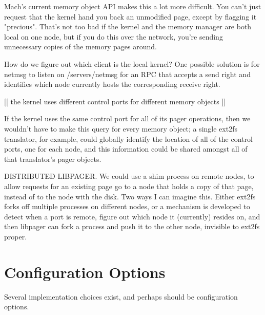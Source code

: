 \documentclass{article}
\begin{document}
Mach's current memory object API makes this a lot more difficult.  You
can't just request that the kernel hand you back an unmodified page,
except by flagging it "precious".  That's not too bad if the kernel
and the memory manager are both local on one node, but if you do this
over the network, you're sending unnecessary copies of the memory
pages around.

How do we figure out which client is the local kernel?  One possible
solution is for netmsg to listen on /servers/netmsg for an RPC that
accepts a send right and identifies which node currently hosts the
corresponding receive right.

[[ the kernel uses different control ports for different memory objects ]]

  If the kernel uses the same control port for all of its pager
  operations, then we wouldn't have to make this query for every memory
  object; a single ext2fs translator, for example, could globally
  identify the location of all of the control ports, one for each node,
  and this information could be shared amongst all of that translator's
  pager objects.

DISTRIBUTED LIBPAGER.  We could use a shim process on remote nodes, to
allow requests for an existing page go to a node that holds a copy of
that page, instead of to the node with the disk.  Two ways I can
imagine this.  Either ext2fs forks off multiple processes on different
nodes, or a mechanism is developed to detect when a port is remote,
figure out which node it (currently) resides on, and then libpager can
fork a process and push it to the other node, invisible to ext2fs
proper.


\section{Configuration Options}

Several implementation choices exist, and perhaps should be configuration options.
\end{document}

